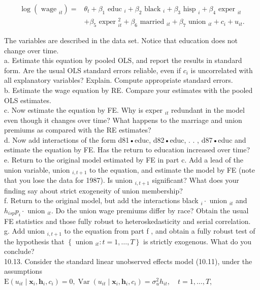 \documentclass[10pt]{article}
\begin{document}
$$
\begin{aligned}
\log \left(\text { wage }_{i t}\right)= & \theta_{t}+\beta_{1} \text { educ }_{i}+\beta_{2} \text { black }_{i}+\beta_{3} \text { hisp }_{i}+\beta_{4} \text { exper }_{i t} \\
& +\beta_{5} \text { exper }_{i t}^{2}+\beta_{6} \text { married }_{i t}+\beta_{7} \text { union }_{i t}+c_{i}+u_{i t} .
\end{aligned}
$$

The variables are described in the data set. Notice that education does not change over time.\\
a. Estimate this equation by pooled OLS, and report the results in standard form. Are the usual OLS standard errors reliable, even if $c_{i}$ is uncorrelated with all explanatory variables? Explain. Compute appropriate standard errors.\\
b. Estimate the wage equation by RE. Compare your estimates with the pooled OLS estimates.\\
c. Now estimate the equation by FE. Why is exper $_{i t}$ redundant in the model even though it changes over time? What happens to the marriage and union premiums as compared with the RE estimates?\\
d. Now add interactions of the form d81•educ, d82•educ, . . , d87•educ and estimate the equation by FE. Has the return to education increased over time?\\
e. Return to the original model estimated by FE in part c. Add a lead of the union variable, union $_{i, t+1}$ to the equation, and estimate the model by FE (note that you lose the data for 1987). Is union $_{i, t+1}$ significant? What does your finding say about strict exogeneity of union membership?\\
f. Return to the original model, but add the interactions black $_{i} \cdot$ union $_{i t}$ and $h_{i s p} p_{i} \cdot$ union $_{i t}$. Do the union wage premiums differ by race? Obtain the usual FE statistics and those fully robust to heteroskedasticity and serial correlation.\\
g. Add union $_{i, t+1}$ to the equation from part f , and obtain a fully robust test of the hypothesis that $\left\{\right.$ union $\left._{i t}: t=1, \ldots, T\right\}$ is strictly exogenous. What do you conclude?\\
10.13. Consider the standard linear unobserved effects model (10.11), under the assumptions\\
$\mathrm{E}\left(u_{i t} \mid \mathbf{x}_{i}, \mathbf{h}_{i}, c_{i}\right)=0, \operatorname{Var}\left(u_{i t} \mid \mathbf{x}_{i}, \mathbf{h}_{i}, c_{i}\right)=\sigma_{u}^{2} h_{i t}, \quad t=1, \ldots, T$,\\
\end{document}
